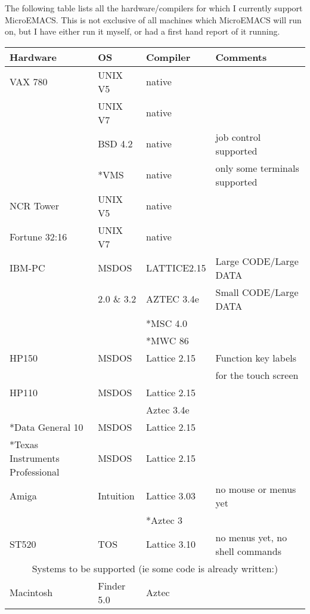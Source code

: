 The following table lists all the hardware/compilers for which I
currently support MicroEMACS.  This is not exclusive of all machines
which MicroEMACS will run on, but I have either run it myself, or had a
first hand report of it running.

\begin{tabular}{lllp{137pt}}
Hardware &OS&Compiler &Comments\\ \hline

VAX 780&UNIX V5&native\\

&UNIX V7&native\\

&BSD 4.2&native &job control supported\\

&*VMS&native &only some terminals supported\\

NCR Tower &UNIX V5&native\\

Fortune 32:16 &UNIX V7&native\\

IBM-PC&MSDOS &LATTICE2.15 &Large CODE/Large DATA\\

& 2.0 \& 3.2 &AZTEC 3.4e   &Small CODE/Large DATA\\

&  &*MSC 4.0 \\

&&*MWC 86\\

HP150&MSDOS&Lattice 2.15 &Function key labels\\

&&&for the touch screen\\

HP110&MSDOS&Lattice 2.15\\

&&Aztec 3.4e\\

*Data General 10 & MSDOS&Lattice 2.15\\

*Texas Instruments Professional & MSDOS& Lattice 2.15\\

Amiga&Intuition & Lattice 3.03 & no mouse or menus yet\\

& &*Aztec 3\\

ST520&TOS&Lattice 3.10& no menus yet, no shell commands\\ %
\multicolumn{4}{c}{Systems to be supported (ie some code is already
written:)}\\

Macintosh& Finder 5.0& Aztec\\

\end{tabular}

